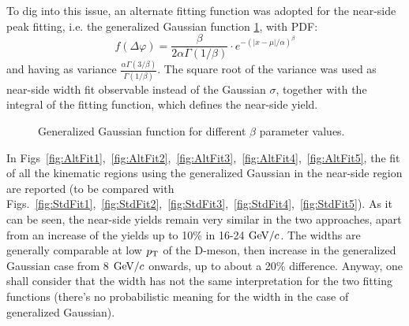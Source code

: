 To dig into this issue, an alternate fitting function was adopted for the near-side peak fitting, i.e. the generalized Gaussian function \ref{fig:GenGauss}, with PDF:
\begin{equation}
f(\Delta\varphi) = \frac{\beta}{2\alpha\Gamma(1/\beta)}\cdot e^{-(|x-\mu|/\alpha)^\beta}
\end{equation}
and having as variance $\frac{\alpha\Gamma(3/\beta)}{\Gamma(1/\beta)}$.
The square root of the variance was used as near-side width fit observable instead of the Gaussian $\sigma$, together with the integral of the fitting function, which defines the near-side yield.

\begin{figure}[h]
\centering
{}
\caption{Generalized Gaussian function for different $\beta$ parameter values.}
\label{fig:GenGauss}
\end{figure}

In Figs~\ref{fig:AltFit1},~\ref{fig:AltFit2},~\ref{fig:AltFit3},~\ref{fig:AltFit4},~\ref{fig:AltFit5}, the fit of all the kinematic regions using the generalized Gaussian in the near-side region are reported (to be compared with Figs.~\ref{fig:StdFit1},~\ref{fig:StdFit2},~\ref{fig:StdFit3},~\ref{fig:StdFit4},~\ref{fig:StdFit5}).
As it can be seen, the near-side yields remain very similar in the two approaches, apart from an increase of the yields up to 10\% in 16-24 $\mathrm{GeV}/c$. The widths are generally comparable at low $p_{\rm T}$ of the D-meson, then increase in the generalized Gaussian case from 8 $\mathrm{GeV}/c$ onwards, up to about a 20\% difference. Anyway, one shall consider that the width has not the same interpretation for the two fitting functions (there's no probabilistic meaning for the width in the case of generalized Gaussian).

